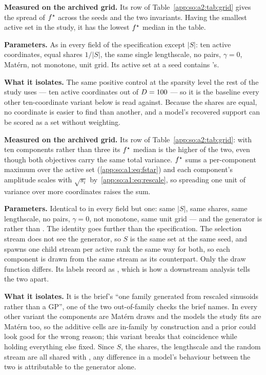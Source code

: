 \textbf{Measured on the archived grid.} Its row of
Table~\ref{app:so:a2:tab:grid} gives the spread of $f^\star$ across the seeds
and the two invariants. Having the smallest active set in the study, it has the
lowest $f^\star$ median in the table.

\label{app:so:a2:aligned10}

\textbf{Parameters.} As  in every field of the specification
except $|S|$: ten active coordinates, equal shares $1/|S|$, the same single
lengthscale, no pairs, $\gamma=0$, Mat\'ern, not monotone, unit grid. Its
active set at a seed contains 's.

\textbf{What it isolates.} The same positive control at the sparsity level the
rest of the study uses --- ten active coordinates out of
$D=100$ --- so it is the baseline every other ten-coordinate variant
below is read against. Because the shares are equal, no coordinate is easier to
find than another, and a model's recovered support can be scored as a set
without weighting.

\textbf{Measured on the archived grid.} Its row of
Table~\ref{app:so:a2:tab:grid}: with ten components rather than three its
$f^\star$ median is the higher of the two, even though both objectives carry the
same total variance. $f^\star$ sums a per-component maximum
over the active set (\eqref{app:so:a1:eq:fstar}) and each component's
amplitude scales with $\sqrt{s_i}$ by~\eqref{app:so:a1:eq:rescale}, so
spreading one unit of variance over more coordinates raises the sum.

\label{app:so:a2:aligned10-sin}

\textbf{Parameters.} Identical to  in every field but one:
same $|S|$, same shares, same lengthscale, no pairs, $\gamma=0$, not monotone,
same unit grid --- and the generator is  rather than
. The identity goes further than the specification. The
selection stream does not see the generator, so $S$ is the same set at the same
seed, and  spawns one child stream per active rank the same way
for both, so each component is drawn from the same stream as its
 counterpart. Only the draw function differs. Its labels
record  as , which is how a downstream
analysis tells the two apart.

\textbf{What it isolates.} It is the brief's ``one family generated from
rescaled sinusoids rather than a GP'', one of the two out-of-family checks the
brief names. In every other variant the components are Mat\'ern draws and the
models the study fits are Mat\'ern too, so the additive cells are in-family by
construction and a prior could look good for the wrong reason; this variant
breaks that coincidence while holding everything else fixed. Since
$S$, the shares, the lengthscale and the random stream are all shared with
, any difference in a model's behaviour between the two is
attributable to the generator alone.

